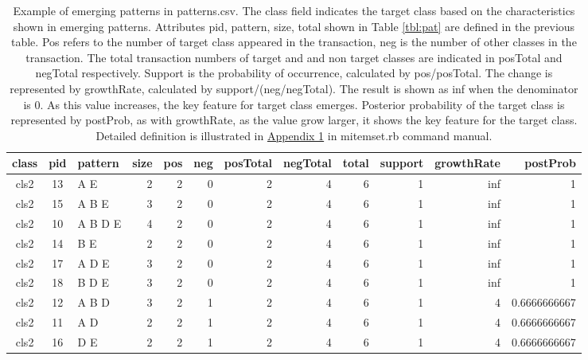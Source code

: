 \begin{table}[htbp]
\begin{center}
\caption{Example of emerging patterns in patterns.csv\label{tbl:ep_pat}.
The class field indicates the target class based on the characteristics shown in emerging patterns. Attributes pid, pattern, size, total shown in Table \ref{tbl:pat} are defined in the previous table. 
Pos refers to the number of target class appeared in the transaction, neg is the number of other classes in the transaction. 
The total transaction numbers of target and and non target classes are indicated in posTotal and negTotal respectively. 
Support is the probability of occurrence, calculated by pos/posTotal.
The change is represented by growthRate, calculated by support/(neg/negTotal). 
The result is shown as inf when the denominator is 0.
As this value increases, the key feature for target class emerges. Posterior probability of the target class is represented by postProb, as with growthRate, as the value grow larger, it shows the key feature for the target class. Detailed definition is illustrated in  \hyperref[sect:ep]{Appendix 1} in mitemset.rb command manual. 
}
\vspace{1em}
{\small
\begin{tabular}{cclrrrrrrrrr}
\hline
class&pid&pattern&size&pos&neg&posTotal&negTotal&total&support&growthRate&postProb\\
\hline
 cls2&13&A E&2&2&0&2&4&6&1&inf&1\\
 cls2&15&A B E&3&2&0&2&4&6&1&inf&1\\
 cls2&10&A B D E&4&2&0&2&4&6&1&inf&1\\
 cls2&14&B E&2&2&0&2&4&6&1&inf&1\\
 cls2&17&A D E&3&2&0&2&4&6&1&inf&1\\
 cls2&18&B D E&3&2&0&2&4&6&1&inf&1\\
 cls2&12&A B D&3&2&1&2&4&6&1&4&0.6666666667\\
 cls2&11&A D&2&2&1&2&4&6&1&4&0.6666666667\\
 cls2&16&D E&2&2&1&2&4&6&1&4&0.6666666667\\
\hline
\end{tabular} 
}
\end{center}
\end{table} 


\vspace{1em}
